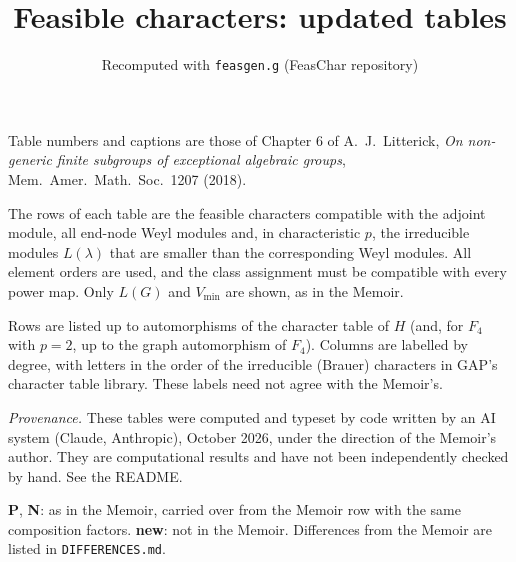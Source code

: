\documentclass[10pt]{article}
\newcommand{\possprim}{\textbf{P}}
\newcommand{\nongcr}{\textbf{N}}
\newcommand{\newrow}{\textbf{new}}
\begin{document}
\title{Feasible characters: updated tables}
\author{Recomputed with \texttt{feasgen.g} (FeasChar repository)}
\date{}
\maketitle
\noindent Table numbers and captions are those of Chapter 6 of A.~J.~Litterick, \emph{On non-generic
finite subgroups of exceptional algebraic groups}, Mem.\ Amer.\ Math.\ Soc.\ 1207 (2018).

\noindent The rows of each table are the feasible characters compatible with the adjoint module, all
end-node Weyl modules and, in characteristic $p$, the irreducible modules $L(\lambda)$ that are
smaller than the corresponding Weyl modules. All element orders are used, and the class
assignment must be compatible with every power map. Only $L(G)$ and $V_{\min}$ are shown, as in
the Memoir.

\noindent Rows are listed up to automorphisms of the character table of $H$ (and, for $F_4$
with $p = 2$, up to the graph automorphism of $F_4$). Columns are labelled by degree, with letters
in the order of the irreducible (Brauer) characters in GAP's character table library. These
labels need not agree with the Memoir's.

\noindent \emph{Provenance.} These tables were computed and typeset by code written by an AI
system (Claude, Anthropic), October 2026, under the direction of the Memoir's author. They are
computational results and have not been independently checked by hand. See the README.

\noindent \possprim, \nongcr: as in the Memoir, carried over from the Memoir row with the same
composition factors. \newrow: not in the Memoir. Differences from the Memoir are listed in
\texttt{DIFFERENCES.md}.
\newpage

\newpage

\newpage

\newpage

\newpage
\end{document}
